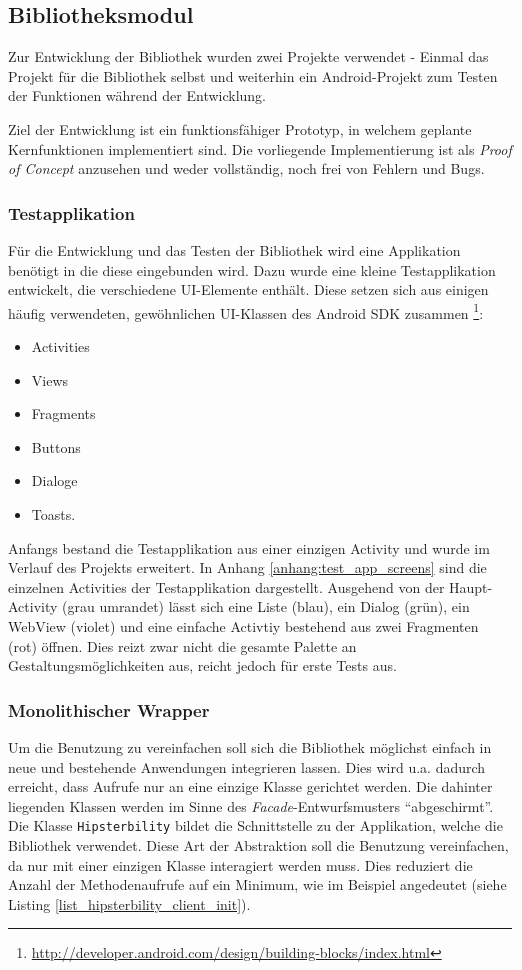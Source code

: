 \subsection{Bibliotheksmodul}
Zur Entwicklung der Bibliothek wurden zwei Projekte verwendet - Einmal das Projekt für die Bibliothek selbst und weiterhin ein Android-Projekt zum Testen der Funktionen während der Entwicklung. 

Ziel der Entwicklung ist ein funktionsfähiger Prototyp, in welchem geplante Kernfunktionen implementiert sind.
Die vorliegende Implementierung ist als \emph{Proof of Concept} anzusehen und weder vollständig, noch frei von Fehlern und Bugs.

\subsubsection{Testapplikation}
Für die Entwicklung und das Testen der Bibliothek wird eine Applikation benötigt in die diese eingebunden wird.
Dazu wurde eine kleine Testapplikation entwickelt, die verschiedene \ac{UI}-Elemente enthält.
Diese setzen sich aus einigen häufig verwendeten, gewöhnlichen \ac{UI}-Klassen des Android SDK zusammen \footnote{\url{http://developer.android.com/design/building-blocks/index.html}}:
\begin{itemize}
	\item Activities
	\item Views
	\item Fragments
	\item Buttons
	\item Dialoge
	\item Toasts.
\end{itemize}
Anfangs bestand die Testapplikation aus einer einzigen Activity und wurde im Verlauf des Projekts erweitert.
In Anhang \ref{anhang:test_app_screens} sind die einzelnen Activities der Testapplikation dargestellt.
Ausgehend von der Haupt-Activity (grau umrandet) lässt sich eine Liste (blau), ein Dialog (grün), ein WebView (violet) und eine einfache Activtiy bestehend aus zwei Fragmenten (rot) öffnen.
Dies reizt zwar nicht die gesamte Palette an Gestaltungsmöglichkeiten aus, reicht jedoch für erste Tests aus.

\subsubsection{Monolithischer Wrapper}
Um die Benutzung zu vereinfachen soll sich die Bibliothek möglichst einfach in neue und bestehende Anwendungen integrieren lassen.
Dies wird u.a. dadurch erreicht, dass Aufrufe nur an eine einzige Klasse gerichtet werden.
Die dahinter liegenden Klassen werden im Sinne des \emph{Facade}-Entwurfsmusters \cite[vgl.][40\psq]{designpattern} \enquote{abgeschirmt}.
Die Klasse \texttt{Hipsterbility} bildet die Schnittstelle zu der Applikation, welche die Bibliothek verwendet.
Diese Art der Abstraktion soll die Benutzung vereinfachen, da nur mit einer einzigen Klasse interagiert werden muss. 
Dies reduziert die Anzahl der Methodenaufrufe auf ein Minimum, wie im Beispiel angedeutet (siehe Listing \ref{list_hipsterbility_client_init}).

